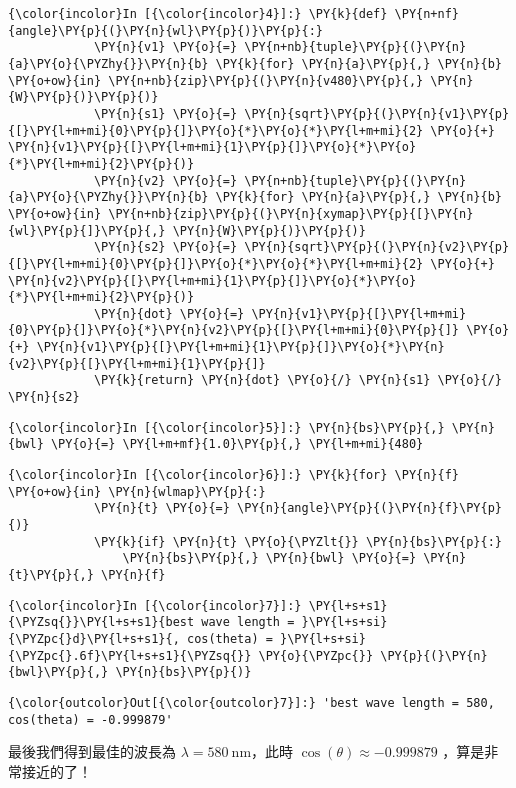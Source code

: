 \documentclass[12pt, a4paper]{article}
\begin{document}
\begin{enumerate}[label={\bf (\alph*)}, leftmargin=0pt]
    \begin{Verbatim}[commandchars=\\\{\}]
{\color{incolor}In [{\color{incolor}4}]:} \PY{k}{def} \PY{n+nf}{angle}\PY{p}{(}\PY{n}{wl}\PY{p}{)}\PY{p}{:}
            \PY{n}{v1} \PY{o}{=} \PY{n+nb}{tuple}\PY{p}{(}\PY{n}{a}\PY{o}{\PYZhy{}}\PY{n}{b} \PY{k}{for} \PY{n}{a}\PY{p}{,} \PY{n}{b} \PY{o+ow}{in} \PY{n+nb}{zip}\PY{p}{(}\PY{n}{v480}\PY{p}{,} \PY{n}{W}\PY{p}{)}\PY{p}{)}
            \PY{n}{s1} \PY{o}{=} \PY{n}{sqrt}\PY{p}{(}\PY{n}{v1}\PY{p}{[}\PY{l+m+mi}{0}\PY{p}{]}\PY{o}{*}\PY{o}{*}\PY{l+m+mi}{2} \PY{o}{+} \PY{n}{v1}\PY{p}{[}\PY{l+m+mi}{1}\PY{p}{]}\PY{o}{*}\PY{o}{*}\PY{l+m+mi}{2}\PY{p}{)}
            \PY{n}{v2} \PY{o}{=} \PY{n+nb}{tuple}\PY{p}{(}\PY{n}{a}\PY{o}{\PYZhy{}}\PY{n}{b} \PY{k}{for} \PY{n}{a}\PY{p}{,} \PY{n}{b} \PY{o+ow}{in} \PY{n+nb}{zip}\PY{p}{(}\PY{n}{xymap}\PY{p}{[}\PY{n}{wl}\PY{p}{]}\PY{p}{,} \PY{n}{W}\PY{p}{)}\PY{p}{)}
            \PY{n}{s2} \PY{o}{=} \PY{n}{sqrt}\PY{p}{(}\PY{n}{v2}\PY{p}{[}\PY{l+m+mi}{0}\PY{p}{]}\PY{o}{*}\PY{o}{*}\PY{l+m+mi}{2} \PY{o}{+} \PY{n}{v2}\PY{p}{[}\PY{l+m+mi}{1}\PY{p}{]}\PY{o}{*}\PY{o}{*}\PY{l+m+mi}{2}\PY{p}{)}
            \PY{n}{dot} \PY{o}{=} \PY{n}{v1}\PY{p}{[}\PY{l+m+mi}{0}\PY{p}{]}\PY{o}{*}\PY{n}{v2}\PY{p}{[}\PY{l+m+mi}{0}\PY{p}{]} \PY{o}{+} \PY{n}{v1}\PY{p}{[}\PY{l+m+mi}{1}\PY{p}{]}\PY{o}{*}\PY{n}{v2}\PY{p}{[}\PY{l+m+mi}{1}\PY{p}{]}
            \PY{k}{return} \PY{n}{dot} \PY{o}{/} \PY{n}{s1} \PY{o}{/} \PY{n}{s2}
\end{Verbatim}

    \begin{Verbatim}[commandchars=\\\{\}]
{\color{incolor}In [{\color{incolor}5}]:} \PY{n}{bs}\PY{p}{,} \PY{n}{bwl} \PY{o}{=} \PY{l+m+mf}{1.0}\PY{p}{,} \PY{l+m+mi}{480}
\end{Verbatim}

    \begin{Verbatim}[commandchars=\\\{\}]
{\color{incolor}In [{\color{incolor}6}]:} \PY{k}{for} \PY{n}{f} \PY{o+ow}{in} \PY{n}{wlmap}\PY{p}{:}
            \PY{n}{t} \PY{o}{=} \PY{n}{angle}\PY{p}{(}\PY{n}{f}\PY{p}{)}
            \PY{k}{if} \PY{n}{t} \PY{o}{\PYZlt{}} \PY{n}{bs}\PY{p}{:}
                \PY{n}{bs}\PY{p}{,} \PY{n}{bwl} \PY{o}{=} \PY{n}{t}\PY{p}{,} \PY{n}{f}
\end{Verbatim}

    \begin{Verbatim}[commandchars=\\\{\}]
{\color{incolor}In [{\color{incolor}7}]:} \PY{l+s+s1}{\PYZsq{}}\PY{l+s+s1}{best wave length = }\PY{l+s+si}{\PYZpc{}d}\PY{l+s+s1}{, cos(theta) = }\PY{l+s+si}{\PYZpc{}.6f}\PY{l+s+s1}{\PYZsq{}} \PY{o}{\PYZpc{}} \PY{p}{(}\PY{n}{bwl}\PY{p}{,} \PY{n}{bs}\PY{p}{)}
\end{Verbatim}

            \begin{Verbatim}[commandchars=\\\{\}]
{\color{outcolor}Out[{\color{outcolor}7}]:} 'best wave length = 580, cos(theta) = -0.999879'
\end{Verbatim}

最後我們得到最佳的波長為 $\lambda = \SI{580}\nm$，此時 $\cos(\theta) \approx -0.999879$ ，算是非常接近的了！

\end{enumerate}
\end{document}

